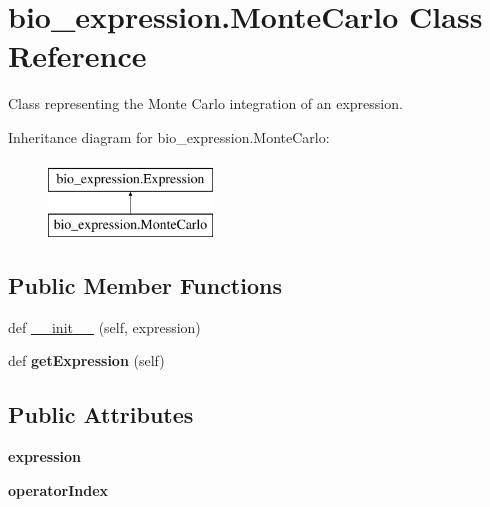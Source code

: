 \hypertarget{classbio__expression_1_1_monte_carlo}{}\section{bio\+\_\+expression.\+Monte\+Carlo Class Reference}
\label{classbio__expression_1_1_monte_carlo}


Class representing the Monte Carlo integration of an expression.  


Inheritance diagram for bio\+\_\+expression.\+Monte\+Carlo\+:\begin{figure}[H]
\begin{center}
\leavevmode
\includegraphics[height=2.000000cm]{classbio__expression_1_1_monte_carlo}
\end{center}
\end{figure}
\subsection*{Public Member Functions}
\begin{DoxyCompactItemize}
\item 
def \hyperlink{classbio__expression_1_1_monte_carlo_a66e674af082f918a4996b03cd83783b4}{\+\_\+\+\_\+init\+\_\+\+\_\+} (self, expression)
\item 
def {\bfseries get\+Expression} (self)\hypertarget{classbio__expression_1_1_monte_carlo_a3fde0db41986c3455e947a72f7b15e56}{}\label{classbio__expression_1_1_monte_carlo_a3fde0db41986c3455e947a72f7b15e56}

\end{DoxyCompactItemize}
\subsection*{Public Attributes}
\begin{DoxyCompactItemize}
\item 
{\bfseries expression}\hypertarget{classbio__expression_1_1_monte_carlo_a6d845e605a8d46fe3d3a99326e959a3d}{}\label{classbio__expression_1_1_monte_carlo_a6d845e605a8d46fe3d3a99326e959a3d}

\item 
{\bfseries operator\+Index}\hypertarget{classbio__expression_1_1_monte_carlo_a561f566604c3f33871959f220768950e}{}\label{classbio__expression_1_1_monte_carlo_a561f566604c3f33871959f220768950e}

\end{DoxyCompactItemize}


